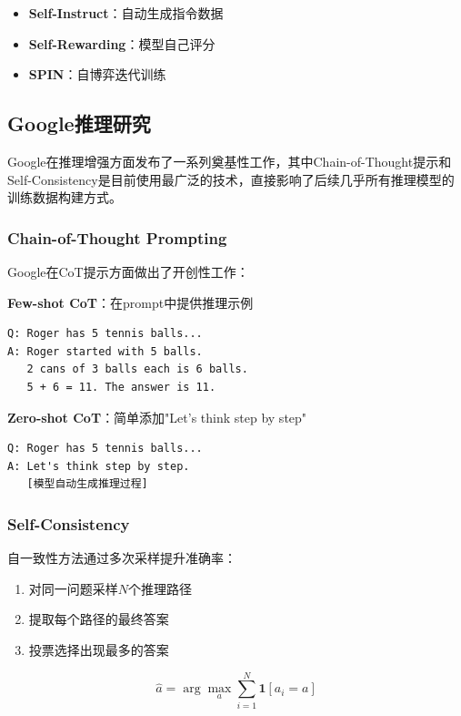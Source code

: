 \documentclass[12pt,a4paper]{article}
\begin{document}
\begin{itemize}
    \item \textbf{Self-Instruct}：自动生成指令数据
    \item \textbf{Self-Rewarding}：模型自己评分
    \item \textbf{SPIN}：自博弈迭代训练
\end{itemize}

\subsection{Google推理研究}

Google在推理增强方面发布了一系列奠基性工作，其中Chain-of-Thought提示和Self-Consistency是目前使用最广泛的技术，直接影响了后续几乎所有推理模型的训练数据构建方式。

\subsubsection{Chain-of-Thought Prompting}

Google在CoT提示方面做出了开创性工作：

\textbf{Few-shot CoT}：在prompt中提供推理示例
\begin{verbatim}
Q: Roger has 5 tennis balls...
A: Roger started with 5 balls. 
   2 cans of 3 balls each is 6 balls.
   5 + 6 = 11. The answer is 11.
\end{verbatim}

\textbf{Zero-shot CoT}：简单添加"Let's think step by step"
\begin{verbatim}
Q: Roger has 5 tennis balls...
A: Let's think step by step.
   [模型自动生成推理过程]
\end{verbatim}

\subsubsection{Self-Consistency}

自一致性方法通过多次采样提升准确率：

\begin{enumerate}
    \item 对同一问题采样$N$个推理路径
    \item 提取每个路径的最终答案
    \item 投票选择出现最多的答案
\end{enumerate}

\begin{equation}
\hat{a} = \arg\max_a \sum_{i=1}^{N} \mathbf{1}[a_i = a]
\end{equation}
\end{document}
